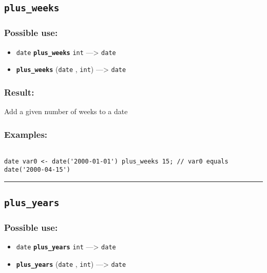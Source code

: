 \documentclass[]{book}
\providecommand{\tightlist}{%
  \setlength{\itemsep}{0pt}\setlength{\parskip}{0pt}}
\theoremstyle{definition}
\theoremstyle{definition}
\theoremstyle{definition}
\theoremstyle{remark}
\begin{document}
\subsection{\texorpdfstring{\texttt{plus\_weeks}}{plus\_weeks}}\label{plus_weeks}

\subsubsection{Possible use:}\label{possible-use-406}

\begin{itemize}
\tightlist
\item
  \texttt{date} \textbf{\texttt{plus\_weeks}} \texttt{int}
  ---\textgreater{} \texttt{date}
\item
  \textbf{\texttt{plus\_weeks}} (\texttt{date} , \texttt{int})
  ---\textgreater{} \texttt{date}
\end{itemize}

\subsubsection{Result:}\label{result-392}

Add a given number of weeks to a date

\subsubsection{Examples:}\label{examples-281}

\begin{verbatim}
 
date var0 <- date('2000-01-01') plus_weeks 15; // var0 equals date('2000-04-15')
\end{verbatim}

\begin{center}\rule{0.5\linewidth}{\linethickness}\end{center}

\subsection{\texorpdfstring{\texttt{plus\_years}}{plus\_years}}\label{plus_years}

\subsubsection{Possible use:}\label{possible-use-407}

\begin{itemize}
\tightlist
\item
  \texttt{date} \textbf{\texttt{plus\_years}} \texttt{int}
  ---\textgreater{} \texttt{date}
\item
  \textbf{\texttt{plus\_years}} (\texttt{date} , \texttt{int})
  ---\textgreater{} \texttt{date}
\end{itemize}
\end{document}
